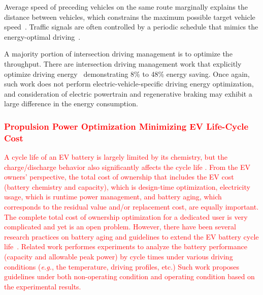 Average speed of preceding vehicles on the same route marginally explains the distance between vehicles, which constrains the maximum possible target vehicle speed~\cite{Mensing:TR13,Lim:TVT17}. Traffic signals are often controlled by a periodic schedule that mimics the energy-optimal driving~\cite{Mandava:ITSC09,Asadi:TCST11,Ozatay:CDC13,Nunzio:JRNC15,Wu:ITS15}.

A majority portion of intersection driving management is to optimize the throughput. There are intersection driving management work that explicitly optimize driving energy~\cite{Nunzio:JRNC15,Wu:ITS15} demonstrating 8\% to 48\% energy saving. Once again, such work does not perform electric-vehicle-specific driving energy optimization, and consideration of electric powertrain and regenerative braking may exhibit a large difference in the energy consumption.
\textcolor{red}{
\subsubsection{Propulsion Power Optimization Minimizing EV Life-Cycle Cost} \label{subsubsec:opt_life_cycle}
A cycle life of an EV battery is largely limited by its chemistry, but the charge/discharge behavior also significantly affects the cycle life \cite{ZS_millner}. From the EV owners' perspective, the total cost of ownership that includes the EV cost (battery chemistry and capacity), which is design-time optimization, electricity usage, which is runtime power management, and battery aging, which corresponds to the residual value and/or replacement cost, are equally important. The complete total cost of ownership optimization for a dedicated user is very complicated  and yet is an open problem. 
%
However, there have been several research practices on battery aging and guidelines to extend the EV battery cycle life~\cite{Sarre:JPS04,Keil:PHD17}. Related work performes experiments to analyze the battery performance (capacity and allowable peak power) by cycle times under various driving conditions (\textit{e.g.}, the temperature, driving profiles, etc.) Such work proposes guidelines under both non-operating condition and operating condition based on the experimental results.}

